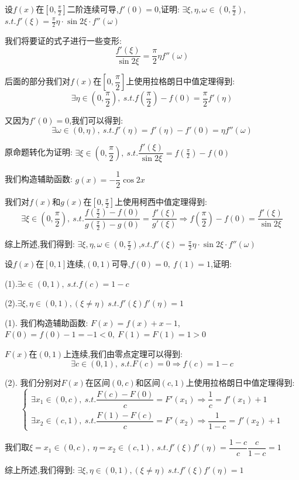 \begin{proposition}
	设$f(x)$在$[0,\frac{\pi}{2}]$二阶连续可导,$f'(0)=0$,证明: $\exists \xi,\eta,\omega\in(0,\frac{\pi}{2})$,$s.t. f'(\xi)=\frac{\pi}{2}\eta\cdot \sin 2\xi\cdot f''(\omega)$
\end{proposition}
\begin{solution}

	我们将要证的式子进行一些变形:
	$$\dfrac{f'(\xi)}{\sin 2\xi}=\dfrac{\pi}{2}\eta f''(\omega)$$

	后面的部分我们对$f(x)$在$[0,\dfrac{\pi}{2}]$上使用拉格朗日中值定理得到:
	$$\exists \eta\in(0,\dfrac{\pi}{2}),\ s.t. f(\frac{\pi}{2})-f(0)=\frac{\pi}{2}f'(\eta)$$

	又因为$f'(0)=0$,我们可以得到:
	$$\exists \omega\in(0,\eta),\ s.t. f'(\eta)=f'(\eta)-f'(0)=\eta f''(\omega)$$

	原命题转化为证明: $\exists\xi\in(0,\dfrac{\pi}{2}),\ s.t. \dfrac{f'(\xi)}{\sin 2\xi}=f(\frac{\pi}{2})-f(0)$

	我们构造辅助函数: $g(x)=-\dfrac{1}{2}\cos 2x$

	我们对$f(x)$和$g(x)$在$[0,\frac{\pi}{2}]$上使用柯西中值定理得到:
	$$\exists\xi\in(0,\frac{\pi}{2}),\ s.t. \dfrac{f(\frac{\pi}{2})-f(0)}{g(\frac{\pi}{2})-g(0)}=\dfrac{f'(\xi)}{g'(\xi)}\Rightarrow f(\frac{\pi}{2})-f(0)=\dfrac{f'(\xi)}{\sin 2\xi}$$

	综上所述,我们得到: $\exists \xi,\eta,\omega\in(0,\frac{\pi}{2})$,$s.t. f'(\xi)=\frac{\pi}{2}\eta\cdot \sin 2\xi\cdot f''(\omega)$
\end{solution}


\begin{proposition}
	设$f(x)$在$[0,1]$连续,$(0,1)$可导,$f(0)=0,\ f(1)=1$,证明:

	(1).$\exists c\in(0,1),\ s.t. f(c)=1-c$

	(2).$\exists \xi,\eta\in(0,1),(\xi\neq \eta)\ s.t. f'(\xi)f'(\eta)=1$
\end{proposition}
\begin{solution}

	(1). 我们构造辅助函数: $F(x)=f(x)+x-1$,$F(0)=f(0)-1=-1<0,\ F(1)=F(1)=1>0$

	$F(x)$在$(0,1)$上连续,我们由零点定理可以得到:
	$$\exists c\in(0,1),\ s.t. F(c)=0\Rightarrow f(c)=1-c$$

	(2). 我们分别对$F(x)$在区间$(0,c)$和区间$(c,1)$上使用拉格朗日中值定理得到:
	$$\left\lbrace
		\begin{array}{l}
			\exists x_{1}\in(0,c),\ s.t. \dfrac{F(c)-F(0)}{c}=F'(x_{1})\Rightarrow \dfrac{1}{c}=f'(x_{1})+1 \\
			\exists x_{2}\in(c,1),\ s.t. \dfrac{F(1)-F(c)}{c}=F'(x_{2})\Rightarrow \dfrac{1}{1-c}=f'(x_{2})+1
		\end{array}
		\right. $$

	我们取$\xi=x_{1}\in(0,c),\ \eta=x_{2}\in(c,1),\ s.t. f'(\xi)f'(\eta)=\dfrac{1-c}{c}\dfrac{c}{1-c}=1$

	综上所述,我们得到: $\exists \xi,\eta\in(0,1),(\xi\neq \eta)\ s.t. f'(\xi)f'(\eta)=1$
\end{solution}

